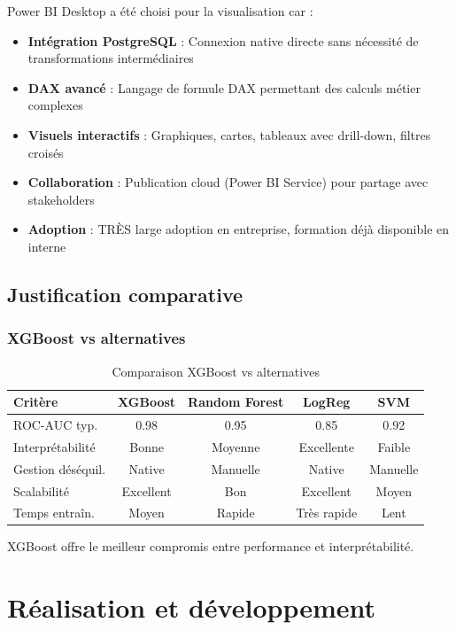 \documentclass[a4paper,12pt,twoside]{report}
\begin{document}
Power BI Desktop a été choisi pour la visualisation car :

\begin{itemize}
    \item \textbf{Intégration PostgreSQL} : Connexion native directe sans nécessité de transformations intermédiaires
    \item \textbf{DAX avancé} : Langage de formule DAX permettant des calculs métier complexes
    \item \textbf{Visuels interactifs} : Graphiques, cartes, tableaux avec drill-down, filtres croisés
    \item \textbf{Collaboration} : Publication cloud (Power BI Service) pour partage avec stakeholders
    \item \textbf{Adoption} : TRÈS large adoption en entreprise, formation déjà disponible en interne
\end{itemize}

\section{Justification comparative}

\subsection{XGBoost vs alternatives}

\begin{table}[H]
\centering
\small
\caption{Comparaison XGBoost vs alternatives}
\begin{tabular}{|l|c|c|c|c|}
\hline
\textbf{Critère} & \textbf{XGBoost} & \textbf{Random Forest} & \textbf{LogReg} & \textbf{SVM} \\
\hline\hline
ROC-AUC typ. & 0.98 & 0.95 & 0.85 & 0.92 \\
\hline
Interprétabilité & Bonne & Moyenne & Excellente & Faible \\
\hline
Gestion déséquil. & Native & Manuelle & Native & Manuelle \\
\hline
Scalabilité & Excellent & Bon & Excellent & Moyen \\
\hline
Temps entraîn. & Moyen & Rapide & Très rapide & Lent \\
\hline
\end{tabular}
\end{table}

XGBoost offre le meilleur compromis entre performance et interprétabilité.

\chapter{Réalisation et développement}
\end{document}
